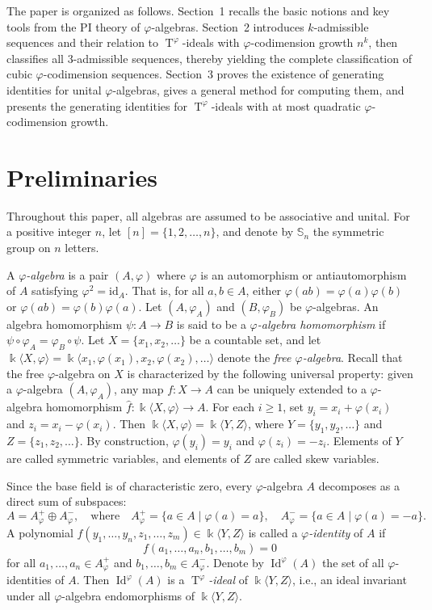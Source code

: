 \documentclass{amsart}
\theoremstyle{definition}
\theoremstyle{remark}
\numberwithin{equation}{section}
\newcommand{\lr}[1]{\langle #1 \rangle}
\def \vp{\varphi}
\def \k{\Bbbk}
\def \S{\mathbb{S}}
\def \Id{\operatorname{Id}}
\def \T{\operatorname{T}}
\def \id{\mathrm{id}}
\begin{document}
	The paper is organized as follows. Section~1 recalls the basic notions and key tools from the PI theory of $\vp$-algebras. Section~2 introduces $k$-admissible sequences and their relation to $\T^\vp$-ideals with $\vp$-codimension growth $n^k$, then classifies all $3$-admissible sequences, thereby yielding the complete classification of cubic $\vp$-codimension sequences. Section~3 proves the existence of generating identities for unital $\vp$-algebras, gives a general method for computing them, and presents the generating identities for $\T^\vp$-ideals with at most quadratic $\vp$-codimension growth.
	
\section{Preliminaries} \label{sec1}
	Throughout this paper, all algebras are assumed to be associative and unital. For a positive integer $n$, let $[n] = \{1,2,\dots,n\}$, and denote by $\S_n$ the symmetric group on $n$ letters.
	
	A \emph{$\vp$-algebra} is a pair $(A, \vp)$ where $\vp$ is an automorphism or antiautomorphism of $A$ satisfying $\vp^2 = \id_A$. That is, for all $a,b \in A$, either $\vp(ab) = \vp(a)\vp(b)$ or $\vp(ab) = \vp(b)\vp(a)$. Let $(A,\vp_A)$ and $(B,\vp_B)$ be $\vp$-algebras. An algebra homomorphism $\psi \colon A \to B$ is said to be a \emph{$\vp$-algebra homomorphism} if $\psi \circ \vp_A = \vp_B \circ \psi$. Let $X = \{x_1, x_2, \dots\}$ be a countable set, and let $\k \lr{X, \vp} = \k \lr{x_1, \vp(x_1), x_2, \vp(x_2), \dots}$ denote the \emph{free $\vp$-algebra}. Recall that the free $\vp$-algebra on $X$ is characterized by the following universal property: given a $\vp$-algebra $(A, \vp_A)$, any map $f \colon X \to A$ can be uniquely extended to a $\vp$-algebra homomorphism $\hat{f} \colon \k \langle X, \vp \rangle \to A$. For each $i \geq 1$, set $y_i = x_i + \vp(x_i)$ and $z_i = x_i - \vp(x_i)$. Then $\k \lr{X, \vp} = \k \lr{Y, Z}$, where $Y = \{y_1, y_2, \dots\}$ and $Z = \{z_1, z_2, \dots\}$. By construction, $\vp(y_i) = y_i$ and $\vp(z_i) = -z_i$. Elements of $Y$ are called symmetric variables, and elements of $Z$ are called skew variables.
	
	Since the base field is of characteristic zero, every $\vp$-algebra $A$ decomposes as a direct sum of subspaces:
	\[
	A = A_\vp^+ \oplus A_\vp^-, \quad \text{where} \quad A_\vp^+ = \{ a \in A \mid \vp(a) = a \}, \quad A_\vp^- = \{ a \in A \mid \vp(a) = -a \}.
	\]
	A polynomial $f(y_1, \dots, y_n, z_1, \dots, z_m) \in \k \lr{Y, Z}$ is called a \emph{$\vp$-identity} of $A$ if 
	\[
	f(a_1, \dots, a_n, b_1, \dots, b_m) = 0
	\] 
	for all $a_1, \dots, a_n \in A_\vp^+$ and $b_1, \dots, b_m \in A_\vp^-$. Denote by $\Id^\vp(A)$ the set of all $\vp$-identities of $A$. Then $\Id^\vp(A)$ is a \emph{$\T^\vp$-ideal} of $\k \lr{Y, Z}$, i.e., an ideal invariant under all $\vp$-algebra endomorphisms of $\k \lr{Y, Z}$.
	
\end{document}
